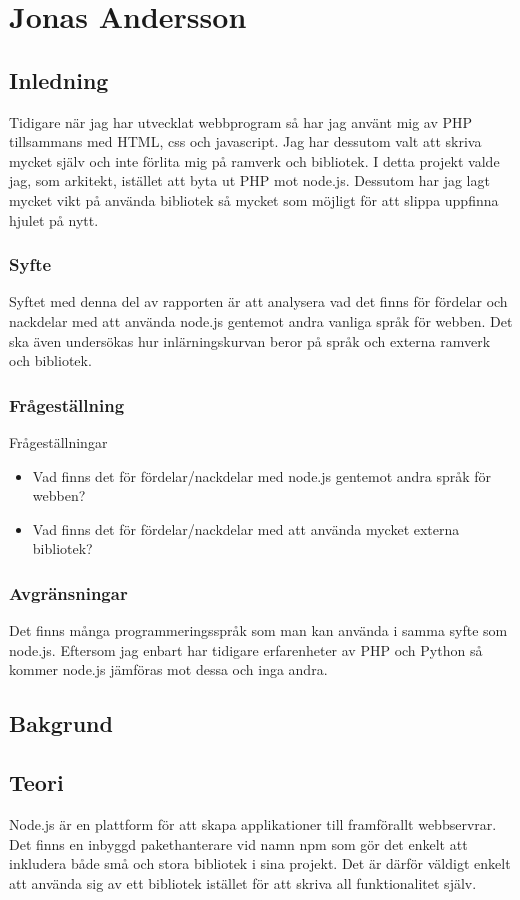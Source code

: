 \section{Jonas Andersson}
\subsection{Inledning} 
Tidigare när jag har utvecklat webbprogram så har jag använt mig av PHP tillsammans med HTML, css och javascript. Jag har dessutom valt att skriva mycket själv och inte förlita mig på ramverk och bibliotek. I detta projekt valde jag, som arkitekt, istället att byta ut PHP mot node.js. Dessutom har jag lagt mycket vikt på använda bibliotek så mycket som möjligt för att slippa uppfinna hjulet på nytt.
\subsubsection{Syfte}
Syftet med denna del av rapporten är att analysera vad det finns för fördelar och nackdelar med att använda node.js gentemot andra vanliga språk för webben. Det ska även undersökas hur inlärningskurvan beror på språk och externa ramverk och bibliotek.
\subsubsection{Frågeställning}
Frågeställningar
\begin{itemize}
  \item Vad finns det för fördelar/nackdelar med node.js gentemot andra språk för webben?
  \item Vad finns det för fördelar/nackdelar med att använda mycket externa bibliotek?
\end{itemize}
\subsubsection{Avgränsningar}
Det finns många programmeringsspråk som man kan använda i samma syfte som node.js. Eftersom jag enbart har tidigare erfarenheter av PHP och Python så kommer node.js jämföras mot dessa och inga andra. 
\subsection{Bakgrund}
\subsection{Teori}
Node.js är en plattform för att skapa applikationer till framförallt webbservrar. Det finns en inbyggd pakethanterare vid namn npm som gör det enkelt att inkludera både små och stora bibliotek i sina projekt. Det är därför väldigt enkelt att använda sig av ett bibliotek istället för att skriva all funktionalitet själv.\\

